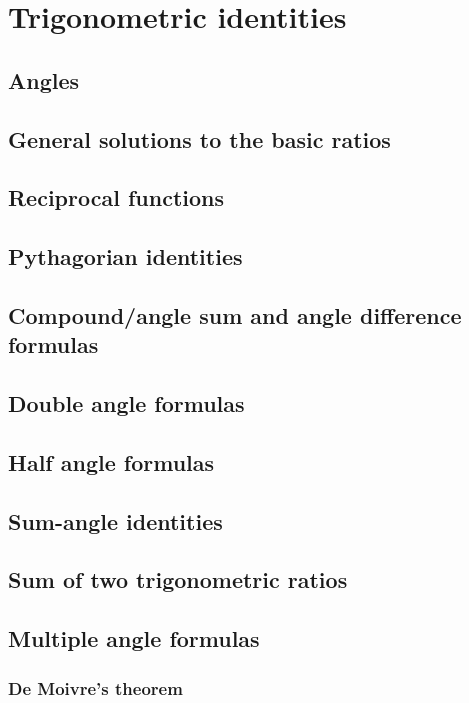 \documentclass{book}
\begin{document}
\chapter{Trigonometric identities}
\section{Angles}

\section{General solutions to the basic ratios}

\section{Reciprocal functions}

\section{Pythagorian identities}

\section{Compound/angle sum and angle difference formulas}

\section{Double angle formulas}

\section{Half angle formulas}

\section{Sum-angle identities}

\section{Sum of two trigonometric ratios}

\section{Multiple angle formulas}
\subsection{De Moivre's theorem}
\end{document}
